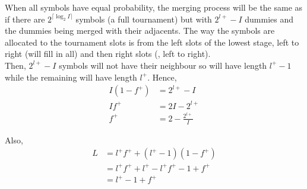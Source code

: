 \documentclass[12pt, a4paper]{article}
\begin{document}
\begin{sol}
When all symbols have equal probability, the merging process will be the same as if there are $2^{\lceil \log_2 I \rceil}$ symbols (a full tournament) but with $2^{l+} - I$ dummies and the dummies being merged with their adjacents.
The way the symbols are allocated to the tournament slots is from the left slots of the lowest stage, left to right (will fill in all) and then right slots (, left to right). \\
Then, $2^{l+} - I$ symbols will not have their neighbour so will have length $l^+ - 1$ while the remaining will have length $l^+$. Hence, 
\begin{align*}
    I(1 - f^+) &= 2^{l+} - I \\
    If^+ &= 2I - 2^{l+} \\
    f^+ &= 2 - \frac{2^{l+}}{I}
\end{align*}

Also, 
\begin{align*}
    L &= l^+ f^+ + (l^+ - 1)(1 - f^+) \\
    &= l^+ f^+ + l^+ - l^+ f^+ - 1 + f^+ \\
    &= l^+ - 1 + f^+
\end{align*}


\end{sol}
\end{document}
